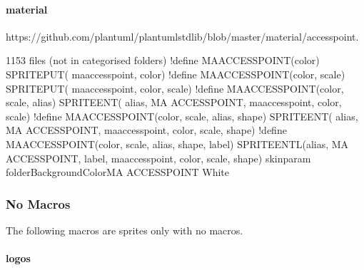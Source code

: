 \documentclass[letterpaper,10pt,english]{sphinxmanual}
\begin{document}
\paragraph{material}
\label{\detokenize{Stdlib/StdLibOverview:material}}
\begin{sphinxVerbatim}[commandchars=\\\{\}]
https://github.com/plantuml/plantuml\PYGZhy{}stdlib/blob/master/material/access\PYGZus{}point.

1153 files (not in categorised folders)
!define MA\PYGZus{}ACCESS\PYGZus{}POINT(\PYGZus{}color)                                 SPRITE\PYGZus{}PUT(                                   ma\PYGZus{}access\PYGZus{}point, \PYGZus{}color)
!define MA\PYGZus{}ACCESS\PYGZus{}POINT(\PYGZus{}color, \PYGZus{}scale)                         SPRITE\PYGZus{}PUT(                                   ma\PYGZus{}access\PYGZus{}point, \PYGZus{}color, \PYGZus{}scale)
!define MA\PYGZus{}ACCESS\PYGZus{}POINT(\PYGZus{}color, \PYGZus{}scale, \PYGZus{}alias)                 SPRITE\PYGZus{}ENT(  \PYGZus{}alias, MA ACCESS\PYGZus{}POINT,         ma\PYGZus{}access\PYGZus{}point, \PYGZus{}color, \PYGZus{}scale)
!define MA\PYGZus{}ACCESS\PYGZus{}POINT(\PYGZus{}color, \PYGZus{}scale, \PYGZus{}alias, \PYGZus{}shape)         SPRITE\PYGZus{}ENT(  \PYGZus{}alias, MA ACCESS\PYGZus{}POINT,         ma\PYGZus{}access\PYGZus{}point, \PYGZus{}color, \PYGZus{}scale, \PYGZus{}shape)
!define MA\PYGZus{}ACCESS\PYGZus{}POINT(\PYGZus{}color, \PYGZus{}scale, \PYGZus{}alias, \PYGZus{}shape, \PYGZus{}label) SPRITE\PYGZus{}ENT\PYGZus{}L(\PYGZus{}alias, MA ACCESS\PYGZus{}POINT, \PYGZus{}label, ma\PYGZus{}access\PYGZus{}point, \PYGZus{}color, \PYGZus{}scale, \PYGZus{}shape)
skinparam folderBackgroundColor\PYGZlt{}\PYGZlt{}MA ACCESS\PYGZus{}POINT\PYGZgt{}\PYGZgt{} White
\end{sphinxVerbatim}


\subsubsection{No Macros}
\label{\detokenize{Stdlib/StdLibOverview:no-macros}}
The following macros are sprites only with no macros.


\paragraph{logos}
\label{\detokenize{Stdlib/StdLibOverview:logos}}
\end{document}
